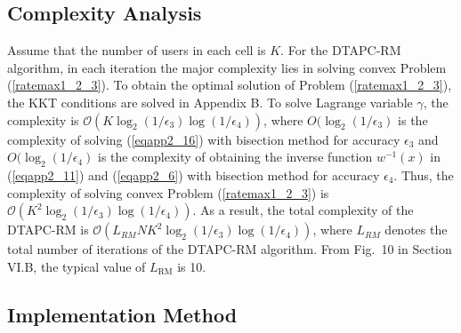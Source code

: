 \documentclass[journal]{IEEEtran}
\begin{document}
\subsection{Complexity Analysis}
Assume that the number of users in each cell is $K$.
For the DTAPC-RM algorithm, in each iteration the major complexity lies in solving convex Problem (\ref{ratemax1_2_3}).
To obtain the optimal solution of Problem (\ref{ratemax1_2_3}), the KKT conditions are solved in Appendix B.
To solve Lagrange variable $\gamma$, the complexity is $\mathcal O(K\log_2(1/\epsilon_3) \log(1/\epsilon_4))$, where $O(\log_2(1/\epsilon_3)$ is the complexity of solving (\ref{eqapp2_16}) with bisection method for accuracy $\epsilon_3$ and $O(\log_2(1/\epsilon_4)$ is the complexity of obtaining the inverse function $w^{-1}(x)$ in (\ref{eqapp2_11}) and (\ref{eqapp2_6}) with bisection method for accuracy $\epsilon_4$.
Thus, the complexity of solving convex Problem (\ref{ratemax1_2_3}) is $\mathcal O(K^2\log_2(1/\epsilon_3) \log(1/\epsilon_4))$.
As a result, the total complexity of the DTAPC-RM is $\mathcal O(L_{RM}NK^2\log_2(1/\epsilon_3) \log(1/\epsilon_4))$, where $L_{RM}$ denotes the total number of iterations of the DTAPC-RM algorithm.
From Fig.~10 in Section VI.B, the typical value of $L_{\text{RM}}$ is 10.


\subsection{Implementation Method}
\end{document}
